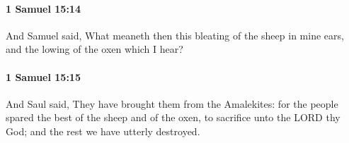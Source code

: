		\paragraph{1 Samuel 15:14} %
			\label{1SAMUEL-15-14}

			And Samuel said, What meaneth then this bleating of the sheep in mine ears, and the lowing of the oxen which I hear?


		\paragraph{1 Samuel 15:15} %
			\label{1SAMUEL-15-15}

			And Saul said, They have brought them from the Amalekites: for the people spared the best of the sheep and of the oxen, to sacrifice unto the LORD thy God; and the rest we have utterly destroyed.


